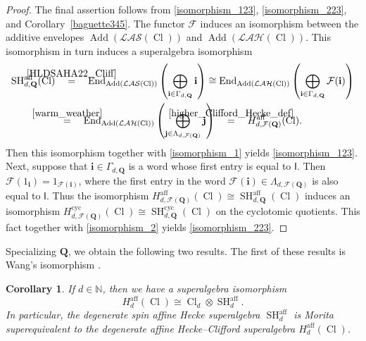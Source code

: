 \documentclass[11pt]{amsart}
\newcommand\go{\mathsf{I}}              %
\newtheorem{cor}[theo]{Corollary}
\theoremstyle{definition}
\numberwithin{equation}{section}
\begin{document}
\begin{proof}
The final assertion follows from \cref{isomorphism_123}, \cref{isomorphism_223}, and Corollary~\ref{baguette345}. The functor $ \mathcal{F} $  induces an isomorphism between the additive envelopes $ \operatorname{Add}(\mathcal{LAS}(\operatorname{Cl})) $ and $ \operatorname{Add}(\mathcal{LAH}(\operatorname{Cl})) $. This isomorphism in turn induces a superalgebra isomorphism 
\begin{multline*}
\operatorname{SH}^{\operatorname{aff}}_{d,\mathbf{Q}}(\operatorname{Cl}) \quad \stackrel{\mathclap{\cref{HLDSAHA22_Cliff}}}{=} \quad \operatorname{End}_{\operatorname{Add}(\mathcal{LAS}(\operatorname{Cl}))}\left(\bigoplus_{\mathbf{i} \in \Gamma_{d,\mathbf{Q}}} \mathbf{i} \right) \cong \operatorname{End}_{\operatorname{Add}(\mathcal{LAH}(\operatorname{Cl}))}\left(\bigoplus_{\mathbf{i} \in \Gamma_{d,\mathbf{Q}}} \mathcal{F}(\mathbf{i}) \right)
\\ \stackrel{\mathclap{\cref{warm_weather}}}{=} \quad \operatorname{End}_{\operatorname{Add}(\mathcal{LAH}(\operatorname{Cl}))}\left(\bigoplus_{\mathbf{j} \in \Lambda_{d,\mathcal{F}(\mathbf{Q})}} \mathbf{j}\right) \quad \stackrel{\mathclap{\cref{higher_Clifford_Hecke_def}}}{=} \quad H_{d,\mathcal{F}(\mathbf{Q})}^{\operatorname{aff}}(\operatorname{Cl}). 
\end{multline*}
Then this isomorphism together with \cref{isomorphism_1} yields \cref{isomorphism_123}. Next, suppose that $ \mathbf{i} \in \Gamma_{d,\mathbf{Q}} $ is a word whose first entry is equal to $ \go $. Then $ \mathcal{F}(1_{\mathbf{i}}) = 1_{\mathcal{F}(\mathbf{i})} $, where the 
first entry in the word $ \mathcal{F}(\mathbf{i}) \in \Lambda_{d,\mathcal{F}(\mathbf{Q})} $ is also equal to $ \go $. Thus the isomorphism $ H_{d,\mathcal{F}(\mathbf{Q})}^{\operatorname{aff}}(\operatorname{Cl}) \cong \operatorname{SH}^{\operatorname{aff}}_{d,\mathbf{Q}}(\operatorname{Cl}) $ induces an isomorphism $ H_{d,\mathcal{F}(\mathbf{Q})}^{\operatorname{cyc}}(\operatorname{Cl}) \cong \operatorname{SH}^{\operatorname{cyc}}_{d,\mathbf{Q}}(\operatorname{Cl}) $ on the cyclotomic quotients. This fact together with \cref{isomorphism_2} yields \cref{isomorphism_223}. 
\end{proof}

Specializing $ \mathbf{Q} $, we obtain the following two results. The first of these results is Wang's isomorphism \cite[Thm.~4.1]{Wang}.


\begin{cor}
If $ d \in \mathbb{N} $, then we have a superalgebra isomorphism
\begin{equation*}
H_{d}^{\operatorname{aff}}(\operatorname{Cl}) \cong \operatorname{Cl}_{d} \otimes \operatorname{SH}^{\operatorname{aff}}_{d}.
\end{equation*}
In particular, the degenerate spin affine Hecke superalgebra $ \operatorname{SH}^{\operatorname{aff}}_{d} $ is Morita superequivalent to the degenerate affine Hecke--Clifford superalgebra $ H_{d}^{\operatorname{aff}}(\operatorname{Cl}) $.
\end{cor}
\end{document}
